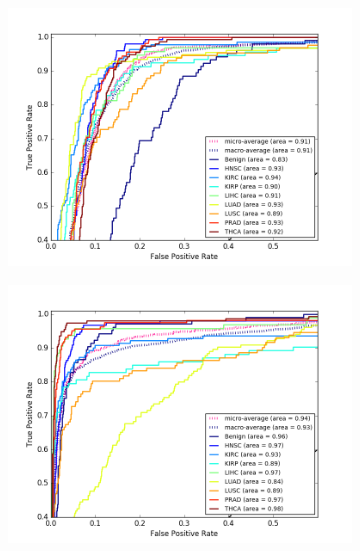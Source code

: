 \begin{figure}[H]
     \centering
     \begin{subfigure}[b]{0.49\textwidth}
         \centering
         \includegraphics[width=\textwidth]{img/c_r/c_r_sdae_dgmu_roc.png}
         \caption{}
     \end{subfigure}
     \hfill
     \begin{subfigure}[b]{0.49\textwidth}
         \centering
         \includegraphics[width=\textwidth]{img/c_r/c_r_sdae_gmu_roc.png}
         \caption{}
     \end{subfigure}
     \hfill
     \begin{subfigure}[b]{0.49\textwidth}
         \centering

\end{subfigure}
\end{figure}
